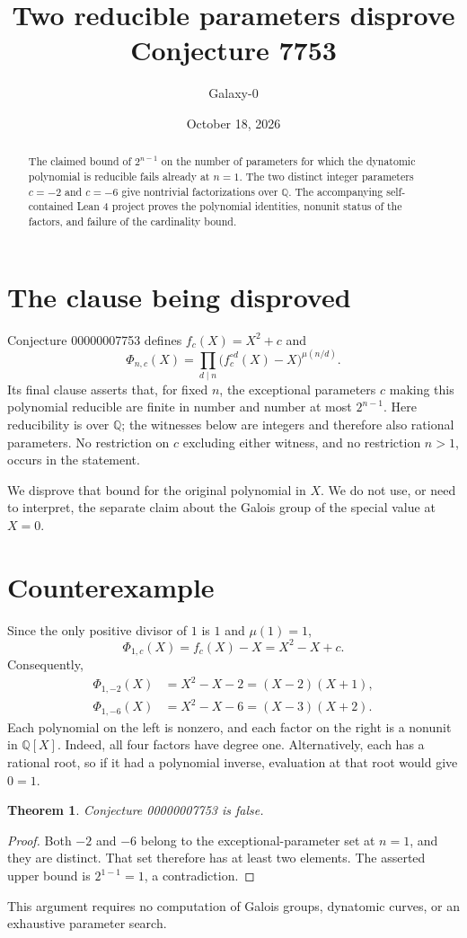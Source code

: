 \documentclass[11pt]{article}
\title{Two reducible parameters disprove Conjecture 7753}
\author{Galaxy-0}
\date{October 18, 2026}
\newtheorem{theorem}{Theorem}
\begin{document}
\maketitle
\begin{abstract}
The claimed bound of $2^{n-1}$ on the number of parameters for which the dynatomic polynomial is reducible fails already at $n=1$. The two distinct integer parameters $c=-2$ and $c=-6$ give nontrivial factorizations over $\mathbb Q$. The accompanying self-contained Lean 4 project proves the polynomial identities, nonunit status of the factors, and failure of the cardinality bound.
\end{abstract}

\section{The clause being disproved}
Conjecture 00000007753 defines $f_c(X)=X^2+c$ and
\[
 \Phi_{n,c}(X)=\prod_{d\mid n}\bigl(f_c^{\circ d}(X)-X\bigr)^{\mu(n/d)}.
\]
Its final clause asserts that, for fixed $n$, the exceptional parameters $c$ making this polynomial reducible are finite in number and number at most $2^{n-1}$. Here reducibility is over $\mathbb Q$; the witnesses below are integers and therefore also rational parameters. No restriction on $c$ excluding either witness, and no restriction $n>1$, occurs in the statement.

We disprove that bound for the original polynomial in $X$. We do not use, or need to interpret, the separate claim about the Galois group of the special value at $X=0$.

\section{Counterexample}
Since the only positive divisor of $1$ is $1$ and $\mu(1)=1$,
\[
 \Phi_{1,c}(X)=f_c(X)-X=X^2-X+c.
\]
Consequently,
\begin{align*}
 \Phi_{1,-2}(X)&=X^2-X-2=(X-2)(X+1),\\
 \Phi_{1,-6}(X)&=X^2-X-6=(X-3)(X+2).
\end{align*}
Each polynomial on the left is nonzero, and each factor on the right is a nonunit in $\mathbb Q[X]$. Indeed, all four factors have degree one. Alternatively, each has a rational root, so if it had a polynomial inverse, evaluation at that root would give $0=1$.

\begin{theorem}
Conjecture 00000007753 is false.
\end{theorem}
\begin{proof}
Both $-2$ and $-6$ belong to the exceptional-parameter set at $n=1$, and they are distinct. That set therefore has at least two elements. The asserted upper bound is $2^{1-1}=1$, a contradiction.
\end{proof}
This argument requires no computation of Galois groups, dynatomic curves, or an exhaustive parameter search.
\end{document}
